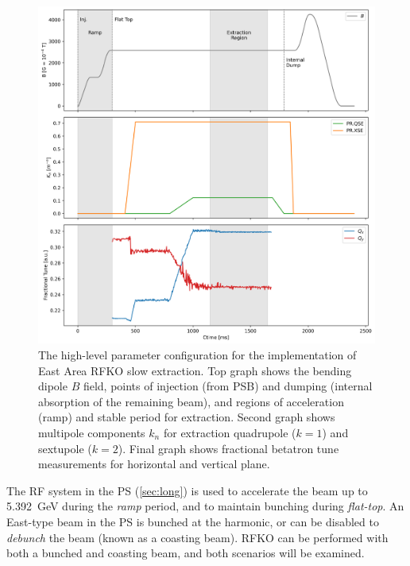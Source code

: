 \documentclass[a4paper,twoside,11pt]{report}
\begin{document}
\begin{figure}[h]
  \centering
  \includegraphics[width=0.9\linewidth]{cyclegraphs.png}
  \caption[High-level parameter graphs and tune measurements during RFKO slow extraction]{The high-level parameter configuration for the implementation of East Area RFKO slow extraction. Top graph shows the bending dipole $B$ field, points of injection (from PSB) and dumping (internal absorption of the remaining beam), and regions of acceleration (ramp) and stable period for extraction. Second graph shows multipole components $k_n$ for extraction quadrupole ($k=1$) and sextupole ($k=2$). Final graph shows fractional betatron tune measurements for horizontal and vertical plane.}\label{fig:cycle}
\end{figure}

The RF system in the PS (\autoref{sec:long}) is used to accelerate the beam up to \qty{5.392}{\giga\electronvolt} during the \textit{ramp} period, and to maintain bunching during \textit{flat-top}. An East-type beam in the PS is bunched at the  harmonic, or can be disabled to \textit{debunch} the beam (known as a coasting beam). RFKO can be performed with both a bunched and coasting beam, and both scenarios will be examined.
\end{document}

